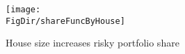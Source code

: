 \begin{figure}[h]
	\centering
	\texttt{[image: \\FigDir/shareFuncByHouse]}
	\caption{House size increases risky portfolio share}
	\label{fig:shareFuncByHouse}
\end{figure}
